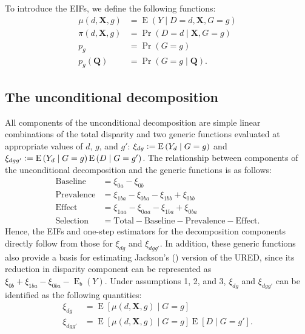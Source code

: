 \documentclass[12pt,a4paper]{article}
\newcommand{\E}{\operatorname{E}}
\def\X{{\boldsymbol X}}
\def\Q{{\boldsymbol Q}}
\DeclareMathOperator{\Pro}{Pr}
\newcommand{\defeq}{\vcentcolon=}
\begin{document}
To introduce the EIFs, we define the following functions:
\begin{align*}
    \mu(d,\X, g)&=\E(Y \mid D=d, \X, G=g) \\
    \pi(d,\X, g) &= \Pro(D=d \mid \X, G=g) \\
    p_g &= \Pro(G=g) \\
    p_g(\Q) &= \Pro(G=g \mid \Q).
\end{align*}

\subsection{The unconditional decomposition}
All components of the unconditional decomposition are simple linear combinations of the total disparity and two generic functions evaluated at appropriate values of $d$, $g$, and $g'$: $\xi_{dg} \defeq \E \left(Y_d \mid G=g  \right)$ and $\xi_{dgg'} \defeq \E \left(Y_d \mid G=g \right)\E \left(D \mid G=g' \right)$. The relationship between components of the unconditional decomposition and the generic functions is as follows:
\begin{align*}
    \text{Baseline} &= \xi_{0a}-\xi_{0b}  \\
    \text{Prevalence} &= \xi_{1ba}-\xi_{0ba}-\xi_{1bb}+\xi_{0bb} \\
    \text{Effect} &= \xi_{1aa}-\xi_{0aa} - \xi_{1ba}+\xi_{0ba} \\
    \text{Selection} &= \text{Total} - \text{Baseline} - \text{Prevalence} - \text{Effect} .
\end{align*}
Hence, the EIFs and one-step estimators for the decomposition components directly follow from those for $\xi_{dg}$ and $\xi_{dgg'}$. In addition, these generic functions also provide a basis for estimating Jackson's (\citeyear{jackson_decomposition_2018}) version of the URED, since its reduction in disparity component can be represented as $\xi_{0b} + \xi_{1ba}-\xi_{0ba}-\E_b(Y)$. Under assumptions 1, 2, and 3, $\xi_{dg}$ and $\xi_{dgg'}$ can be identified as the following quantities:
\begin{align*}
    \xi_{dg} &= \E \left[\mu(d,\X,g) \mid G=g \right] \\
    \xi_{dgg'} &= \E \left[\mu(d,\X,g) \mid G=g \right] \E \left[D \mid G=g' \right].
\end{align*}
\end{document}
